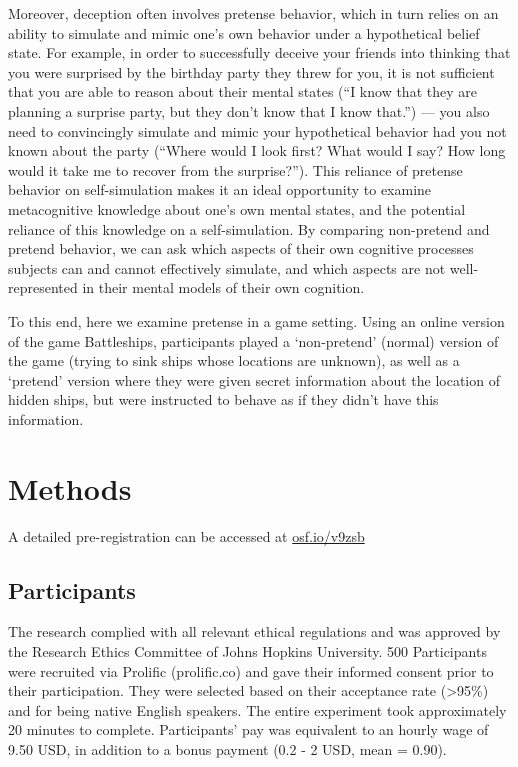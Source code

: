 \documentclass[10pt, letterpaper]{article}
\begin{document}
Moreover, deception often involves pretense behavior, which in turn
relies on an ability to simulate and mimic one's own behavior under a
hypothetical belief state. For example, in order to successfully deceive
your friends into thinking that you were surprised by the birthday party
they threw for you, it is not sufficient that you are able to reason
about their mental states (``I know that they are planning a surprise
party, but they don't know that I know that.'') --- you also need to
convincingly simulate and mimic your hypothetical behavior had you not
known about the party (``Where would I look first? What would I say? How
long would it take me to recover from the surprise?''). This reliance of
pretense behavior on self-simulation makes it an ideal opportunity to
examine metacognitive knowledge about one's own mental states, and the
potential reliance of this knowledge on a self-simulation. By comparing
non-pretend and pretend behavior, we can ask which aspects of their own
cognitive processes subjects can and cannot effectively simulate, and
which aspects are not well-represented in their mental models of their
own cognition.

To this end, here we examine pretense in a game setting. Using an online
version of the game Battleships, participants played a `non-pretend'
(normal) version of the game (trying to sink ships whose locations are
unknown), as well as a `pretend' version where they were given secret
information about the location of hidden ships, but were instructed to
behave as if they didn't have this information.

\hypertarget{methods}{%
\section{Methods}\label{methods}}

A detailed pre-registration can be accessed at
\href{https://osf.io/v9zsb}{osf.io/v9zsb}

\hypertarget{participants}{%
\subsection{Participants}\label{participants}}

The research complied with all relevant ethical regulations and was
approved by the Research Ethics Committee of Johns Hopkins University.
500 Participants were recruited via Prolific (prolific.co) and gave
their informed consent prior to their participation. They were selected
based on their acceptance rate (\textgreater95\%) and for being native
English speakers. The entire experiment took approximately 20 minutes to
complete. Participants' pay was equivalent to an hourly wage of 9.50
USD, in addition to a bonus payment (0.2 - 2 USD, mean = 0.90).
\end{document}
